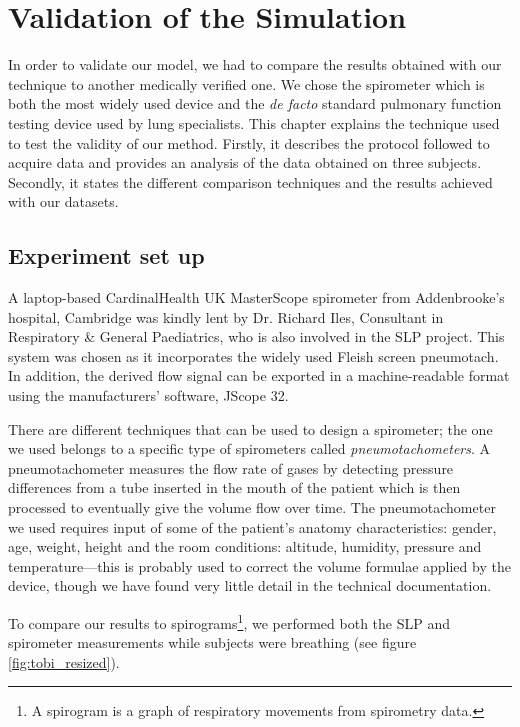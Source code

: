 \chapter{\label{ch:validation}Validation of the Simulation}
In order to validate our model, we had to compare the results obtained with our technique to another medically verified one. We chose the spirometer which is both the most widely used device and the \emph{de facto} standard pulmonary function testing device used by lung specialists. This chapter explains the technique used to test the validity of our method. Firstly, it describes the protocol followed to acquire data and provides an analysis of the data obtained on three subjects. Secondly, it states the different comparison techniques and the results achieved with our datasets.

\section{Experiment set up}
A laptop-based CardinalHealth UK MasterScope spirometer from Addenbrooke's hospital, Cambridge was kindly lent by Dr. Richard Iles, Consultant in Respiratory \& General Paediatrics, who is also involved in the SLP project. 
This system was chosen as it incorporates the widely used Fleish screen pneumotach. In addition, the derived flow signal can be exported in a machine-readable format using the manufacturers' software, JScope 32.

There are different techniques that can be used to design a spirometer; the one we used belongs to a specific type of spirometers called \emph{pneumotachometers}. A pneumotachometer measures the flow rate of gases by detecting pressure differences from a tube inserted in the mouth of the patient which is then processed to eventually give the volume flow over time. The pneumotachometer we used requires input of some of the patient's anatomy characteristics: gender, age, weight, height and the room conditions: altitude, humidity, pressure and temperature---this is probably used to correct the volume formulae applied by the device, though we have found very little detail in the technical documentation.

To compare our results to spirograms\footnote{A spirogram is a graph of respiratory movements from spirometry data.}, we performed both the SLP and spirometer measurements while subjects were breathing (see figure \ref{fig:tobi_resized}).

